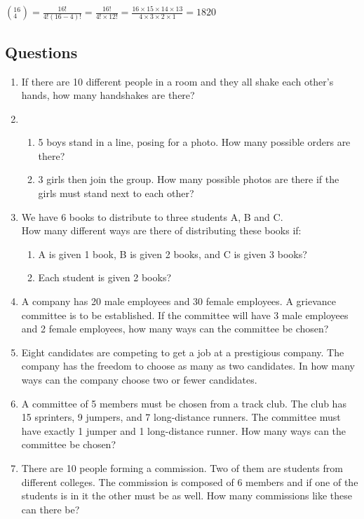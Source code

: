 \documentclass[../main.tex]{subfiles}
\begin{document}
\((_4^16)=\frac{16!}{4!(16-4)!}=\frac{16!}{4!\times 12!}=\frac{16\times 15\times 14\times 13}{4\times 3\times 2\times 1}=1820\)
\pagebreak

\subsection*{Questions}
\label{Combinations and permuations}
\begin{enumerate}
    \item 
    If there are 10 different people in a room and they all shake each other’s hands, how many handshakes are there?
    \item 
        \begin{enumerate}
            \item 5 boys stand in a line, posing for a photo. How many possible orders are there?
            \item 3 girls then join the group. How many possible photos are there if the girls must stand next to each other?
        \end{enumerate}
    \item 
    We have 6 books to distribute to three students A, B and C.\\
    How many different ways are there of distributing these books if:
        \begin{enumerate}
            \item A is given 1 book, B is given 2 books, and C is given 3 books?
            \item Each student is given 2 books?
        \end{enumerate}
    \item 
    A company has 20 male employees and 30 female employees. A grievance committee is to be established. If the committee will have 3 male employees and 2 female employees, how many ways can the committee be chosen?
    \item 
    Eight candidates are competing to get a job at a prestigious company. The company has the freedom to choose as many as two candidates. In how many ways can the company choose two or fewer candidates.
    \item 
    A committee of 5 members must be chosen from a track club. The club has 15 sprinters, 9 jumpers, and 7 long-distance runners. The committee must have exactly 1 jumper and 1 long-distance runner. How many ways can the committee be chosen?
    \item 
    There are 10 people forming a commission. Two of them are students from different colleges. The commission is composed of 6 members and if one of the students is in it the other must be as well. How many commissions like these can there be?

\end{enumerate}
\end{document}

